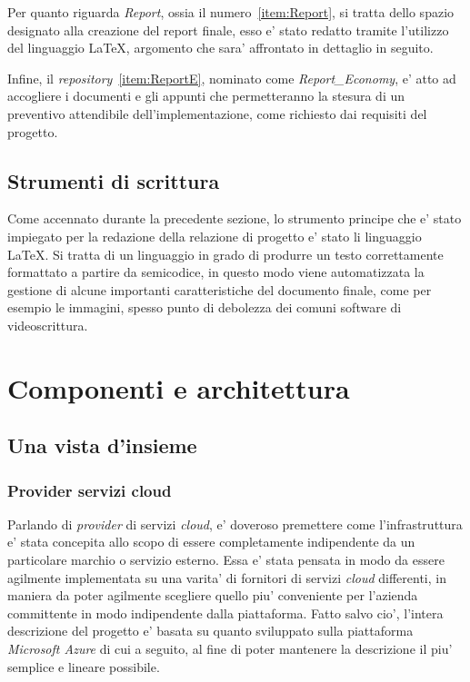 \documentclass[a4paper]{report}
\begin{document}
		Per quanto riguarda \emph{Report}, ossia il numero~\ref{item:Report}, si tratta dello spazio designato alla
		creazione del report finale, esso e' stato redatto tramite l'utilizzo del linguaggio \LaTeX{}, argomento che
		sara' affrontato in dettaglio in seguito.

		Infine, il \emph{repository}~\ref{item:ReportE}, nominato come \emph{Report\_Economy}, e' atto ad accogliere i
		documenti e gli appunti che permetteranno la stesura di un preventivo attendibile dell'implementazione, come
		richiesto dai requisiti del progetto.
	\section{Strumenti di scrittura}\label{strumenti_di_scrittura}
		Come accennato durante la precedente sezione, lo strumento principe che e' stato impiegato per la redazione
		della relazione di progetto e' stato li linguaggio \LaTeX{}. Si tratta di un linguaggio in grado di produrre un
		testo correttamente formattato a partire da semicodice, in questo modo viene automatizzata la gestione di alcune
		importanti caratteristiche del documento finale, come per esempio le immagini, spesso punto di debolezza dei
		comuni software di videoscrittura.

\chapter{Componenti e architettura}\label{componenti_e_architettura}
	\section{Una vista d'insieme}\label{una_vista_dinsieme}
		\subsection{Provider servizi cloud}\label{provider_servizi_cloud}
			Parlando di \emph{provider} di servizi \emph{cloud}, e' doveroso premettere come l'infrastruttura e' stata
			concepita allo scopo di essere completamente indipendente da un particolare marchio o servizio esterno. Essa
			e' stata pensata in modo da essere agilmente implementata su una varita' di fornitori di servizi
			\emph{cloud} differenti, in maniera da poter agilmente scegliere quello piu' conveniente per l'azienda
			committente in modo indipendente dalla piattaforma. Fatto salvo cio', l'intera descrizione del progetto
			e' basata su quanto sviluppato sulla piattaforma \emph{Microsoft Azure} di cui a seguito, al fine di poter
			mantenere la descrizione il piu' semplice e lineare possibile.
\end{document}
